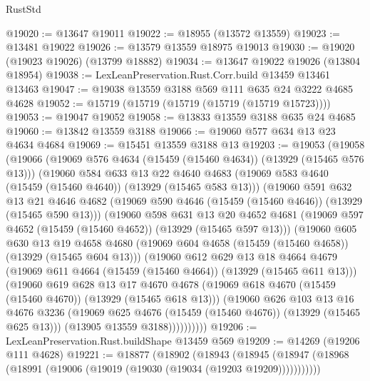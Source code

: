 \begin{lexlean}{RustStd}
\begin{coremodule}
@19020 := @13647 @19011
@19022 := @18955 (@13572 @13559)
@19023 := @13481 @19022
@19026 := @13579 @13559 @18975 @19013
@19030 := @19020 (@19023 @19026) (@13799 @18882)
@19034 := @13647 @19022 @19026 (@13804 @18954)
@19038 := LexLeanPreservation.Rust.Corr.build @13459 @13461 @13463
@19047 := @19038 @13559 @3188 @569 @111 @635 @24 @3222 @4685 @4628
@19052 := @15719 (@15719 (@15719 (@15719 (@15719 @15723))))
@19053 := @19047 @19052
@19058 := @13833 @13559 @3188 @635 @24 @4685
@19060 := @13842 @13559 @3188
@19066 := @19060 @577 @634 @13 @23 @4634 @4684
@19069 := @15451 @13559 @3188 @13
@19203 := @19053
    (@19058
      (@19066
        (@19069 @576 @4634 (@15459 (@15460 @4634)) (@13929 (@15465 @576 @13)))
        (@19060
          @584
          @633
          @13
          @22
          @4640
          @4683
          (@19069 @583 @4640 (@15459 (@15460 @4640)) (@13929 (@15465 @583 @13)))
          (@19060
            @591
            @632
            @13
            @21
            @4646
            @4682
            (@19069 @590 @4646 (@15459 (@15460 @4646)) (@13929 (@15465 @590 @13)))
            (@19060
              @598
              @631
              @13
              @20
              @4652
              @4681
              (@19069 @597 @4652 (@15459 (@15460 @4652)) (@13929 (@15465 @597 @13)))
              (@19060
                @605
                @630
                @13
                @19
                @4658
                @4680
                (@19069 @604 @4658 (@15459 (@15460 @4658)) (@13929 (@15465 @604 @13)))
                (@19060
                  @612
                  @629
                  @13
                  @18
                  @4664
                  @4679
                  (@19069 @611 @4664 (@15459 (@15460 @4664)) (@13929 (@15465 @611 @13)))
                  (@19060
                    @619
                    @628
                    @13
                    @17
                    @4670
                    @4678
                    (@19069 @618 @4670 (@15459 (@15460 @4670)) (@13929 (@15465 @618 @13)))
                    (@19060
                      @626
                      @103
                      @13
                      @16
                      @4676
                      @3236
                      (@19069 @625 @4676 (@15459 (@15460 @4676)) (@13929 (@15465 @625 @13)))
                      (@13905 @13559 @3188))))))))))
@19206 := LexLeanPreservation.Rust.buildShape @13459 @569
@19209 := @14269 (@19206 @111 @4628)
@19221 := @18877
    (@18902
      (@18943
        (@18945 (@18947 (@18968 (@18991 (@19006 (@19019 (@19030 (@19034 (@19203 @19209)))))))))))

\end{coremodule}
\end{lexlean}
